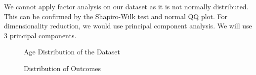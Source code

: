 \documentclass[12pt]{article}
\begin{document}
We cannot apply factor analysis on our dataset as it is not normally distributed. This can be confirmed by the Shapiro-Wilk test and normal QQ plot. For dimensionality reduction, we would use principal component analysis. We will use 3 principal components.

\begin{figure}[h!]
	\centering
	\begin{minipage}{0.48\textwidth}
		\caption{Age Distribution of the Dataset} 
		\label{fig:ageplot}
	\end{minipage}
	\hfill %
	\centering
	\begin{minipage}{0.48\textwidth}
		\centering
		\caption{Distribution of Outcomes} 
		\label{fig:outcomeplot}
	\end{minipage}
\end{figure}
\end{document}
